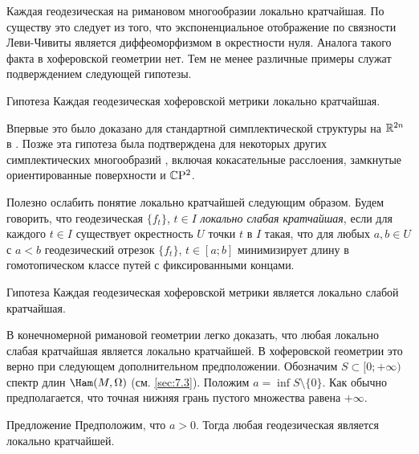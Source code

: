 Каждая геодезическая на римановом многообразии локально кратчайшая.
По существу это следует из того, что экспоненциальное отображение по
связности Леви-Чивиты является диффеоморфизмом в окрестности нуля. 
Аналога такого факта в хоферовской геометрии нет.
Тем не менее различные примеры служат подверждением следующей гипотезы.

\begin{thm}{Гипотеза}\label{12.6.A}
Каждая геодезическая хоферовской метрики локально кратчайшая.
\end{thm}

Впервые это было доказано для стандартной симплектической структуры на
$\mathbb{R}^{2n}$ в \cite{BP1}. 
Позже эта гипотеза была подтверждена для некоторых других
симплектических многообразий \cite{LM2}, включая
кокасательные расслоения, замкнутые ориентированные поверхности и
$\mathbb{C}\mathrm{P}^2$. 

Полезно ослабить понятие локально кратчайшей следующим образом.
Будем говорить, что геодезическая $\{f_t\}$, $t\in I$ \emph{локально слабая кратчайшая}, если для
каждого $t\in I$ существует окрестность $U$ точки $t$ в $I$ такая, что
для любых $a, b\in U$ с $a < b$ геодезический отрезок $\{f_t\}$, $t\in
[a;b]$ минимизирует длину в гомотопическом классе путей с
фиксированными концами. 

\begin{thm}{Гипотеза}\label{12.6.B}
Каждая геодезическая хоферовской метрики является локально слабой кратчайшая.
\end{thm}

В конечномерной римановой геометрии легко доказать, что любая локально
слабая кратчайшая является локально кратчайшей. 
В хоферовской геометрии это верно при следующем дополнительном предположении.
Обозначим $S \subset [0; +\infty)$ спектр длин $\Ham(M, \Omega)$ (см. \ref{sec:7.3}). 
Положим $a = \inf S\setminus\{0\}$.
Как обычно предполагается, что точная нижняя грань пустого множества
равена $+\infty$. 

\begin{thm}[(\cite{LM2})]{Предложение}\label{12.6.C}
Предположим, что $a>0$.
Тогда любая геодезическая является локально кратчайшей.
\end{thm}

